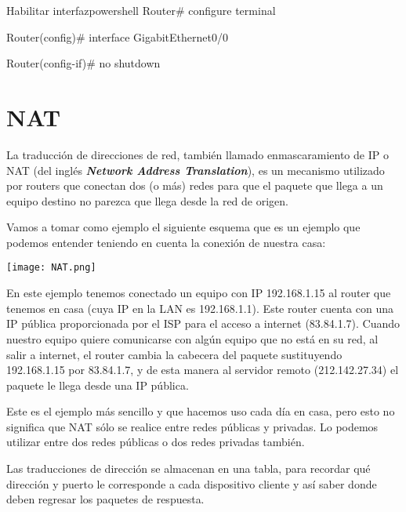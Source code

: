 \begin{mycode}{Habilitar interfaz}{powershell}{}
Router# configure terminal

Router(config)# interface GigabitEthernet0/0

Router(config-if)# no shutdown

\end{mycode}



\hypertarget{nat}{}
\section{NAT}
La traducción de direcciones de red, también llamado enmascaramiento de IP o NAT (del inglés \textit{\textbf{Network Address Translation}}), es un mecanismo utilizado por routers que conectan dos (o más) redes para que el paquete que llega a un equipo destino no parezca que llega desde la red de origen.

Vamos a tomar como ejemplo el siguiente esquema que es un ejemplo que podemos entender teniendo en cuenta la conexión de nuestra casa:

\begin{center}
    \vspace{-15pt}
    \texttt{[image: NAT.png]}
    \vspace{-25pt}
\end{center}

En este ejemplo tenemos conectado un equipo con IP 192.168.1.15 al router que tenemos en casa (cuya IP en la LAN es 192.168.1.1). Este router cuenta con una IP pública proporcionada por el ISP para el acceso a internet (83.84.1.7). Cuando nuestro equipo quiere comunicarse con algún equipo que no está en su red, al salir a internet, el router cambia la cabecera del paquete sustituyendo 192.168.1.15 por 83.84.1.7, y de esta manera al servidor remoto (212.142.27.34) el paquete le llega desde una IP pública.

Este es el ejemplo más sencillo y que hacemos uso cada día en casa, pero esto no significa que NAT sólo se realice entre redes públicas y privadas. Lo podemos utilizar entre dos redes públicas o dos redes privadas también.

Las traducciones de dirección se almacenan en una tabla, para recordar qué dirección y puerto le corresponde a cada dispositivo cliente y así saber donde deben regresar los paquetes de respuesta.


